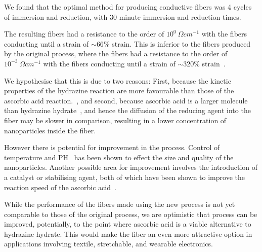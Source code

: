 \documentclass[a4paper, oneside]{discothesis}
\begin{document}
We found that the optimal method for producing conductive fibers was 4 cycles of immersion and reduction, with 30 minute immersion and reduction times. 

The resulting fibers had a resistance to the order of $10^0~\Omega cm^{-1}$ with the fibers conducting until a strain of $\sim 66\%$ strain. This is inferior to the fibers produced by the original process, where the fibers had a resistance to the order of $10^{-3}~\Omega cm^{-1}$ with the fibers conducting until a strain of $\sim 320\%$ strain~\cite{jae2018}.

We hypothesise that this is due to two reasons: First, because the kinetic properties of the hydrazine reaction are more favourable than those of the ascorbic acid reaction.~\cite{kinetics_hydrazine}, and second, because ascorbic acid is a larger molecule~\cite{size_ascorbic} than hydrazine hydrate~\cite{size_hydrazine}, and hence the diffusion of the reducing agent into the fiber may be slower in comparison, resulting in a lower concentration of  nanoparticles inside the fiber.

However there is potential for improvement in the process. Control of temperature and PH~\cite{silver_size,temp_ascorb} has been shown to effect the size and quality of the  nanoparticles. Another possible area for improvement involves the introduction of a catalyst or stabilising agent, both of which have been shown to improve the reaction speed of the ascorbic acid~\cite{ascorb_stabilising_agent, ascorb_rate_alkaline}.

While the performance of the fibers made using the new process is not yet comparable to those of the original process, we are optimistic that process can be improved, potentially, to the point where ascorbic acid is a viable alternative to hydrazine hydrate. This would make the fiber an even more attractive option in applications involving textile, stretchable, and wearable electronics.






\end{document}
